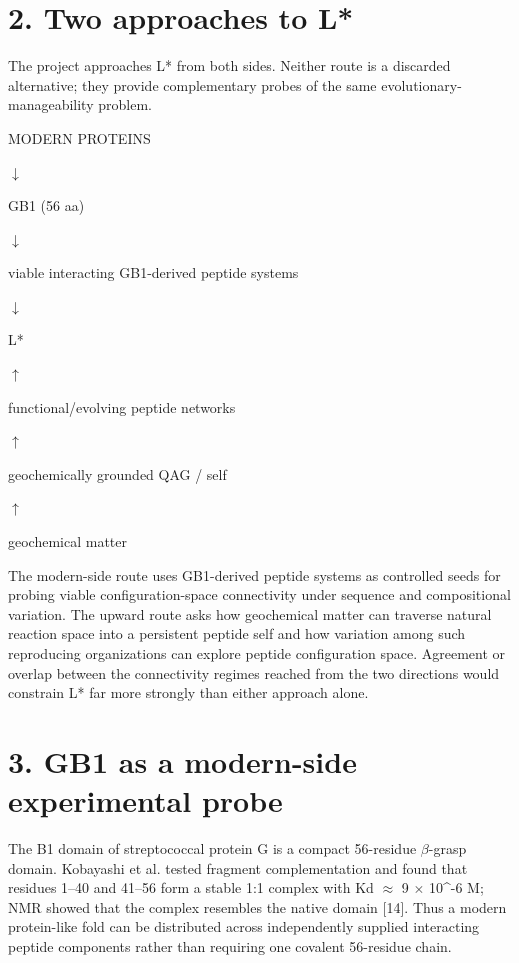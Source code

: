 \documentclass[11pt]{article}
\begin{document}
\hypertarget{two-approaches-to-l}{%
\section*{2. Two approaches to L*}\label{two-approaches-to-l}}

The project approaches L* from both sides. Neither route is a discarded alternative; they provide complementary probes of the same evolutionary-manageability problem.

MODERN PROTEINS

$\downarrow$

GB1 (56 aa)

$\downarrow$

viable interacting GB1-derived peptide systems

$\downarrow$

L*

$\uparrow$

functional/evolving peptide networks

$\uparrow$

geochemically grounded QAG / self

$\uparrow$

geochemical matter

The modern-side route uses GB1-derived peptide systems as controlled seeds for probing viable configuration-space connectivity under sequence and compositional variation. The upward route asks how geochemical matter can traverse natural reaction space into a persistent peptide self and how variation among such reproducing organizations can explore peptide configuration space. Agreement or overlap between the connectivity regimes reached from the two directions would constrain L* far more strongly than either approach alone.

\hypertarget{gb1-as-a-modern-side-experimental-probe}{%
\section*{3. GB1 as a modern-side experimental probe}\label{gb1-as-a-modern-side-experimental-probe}}

The B1 domain of streptococcal protein G is a compact 56-residue $\beta$-grasp domain. Kobayashi et al. tested fragment complementation and found that residues 1--40 and 41--56 form a stable 1:1 complex with Kd $\approx$ 9 $\times$ 10\^{}-6 M; NMR showed that the complex resembles the native domain {[}14{]}. Thus a modern protein-like fold can be distributed across independently supplied interacting peptide components rather than requiring one covalent 56-residue chain.
\end{document}
